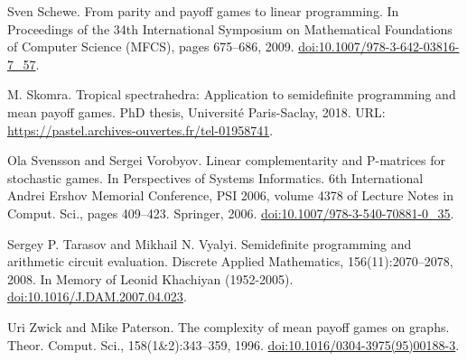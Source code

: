  Sven Schewe. From parity and payoff games to linear programming. In Proceedings of the 34th International Symposium on Mathematical Foundations of Computer Science (MFCS), pages 675–686, 2009. \href{https://doi.org/10.1007/978-3-642-03816-7_57}{doi:10.1007/978-3-642-03816-7\_57}.

 M. Skomra. Tropical spectrahedra: Application to semidefinite programming and mean payoff games. PhD thesis, Université Paris-Saclay, 2018. URL: \href{https://pastel.archives-ouvertes.fr/tel-01958741}{https://pastel.archives-ouvertes.fr/tel-01958741}.

 Ola Svensson and Sergei Vorobyov. Linear complementarity and P-matrices for stochastic games. In Perspectives of Systems Informatics. 6th International Andrei Ershov Memorial Conference, PSI 2006, volume 4378 of Lecture Notes in Comput. Sci., pages 409–423. Springer, 2006. \href{https://doi.org/10.1007/978-3-540-70881-0_35}{doi:10.1007/978-3-540-70881-0\_35}.

 Sergey P. Tarasov and Mikhail N. Vyalyi. Semidefinite programming and arithmetic circuit evaluation. Discrete Applied Mathematics, 156(11):2070–2078, 2008. In Memory of Leonid Khachiyan (1952-2005). \href{https://doi.org/10.1016/J.DAM.2007.04.023}{doi:10.1016/J.DAM.2007.04.023}.

 Uri Zwick and Mike Paterson. The complexity of mean payoff games on graphs. Theor. Comput. Sci., 158(1\&2):343–359, 1996. \href{https://doi.org/10.1016/0304-3975(95)00188-3}{doi:10.1016/0304-3975(95)00188-3}.

